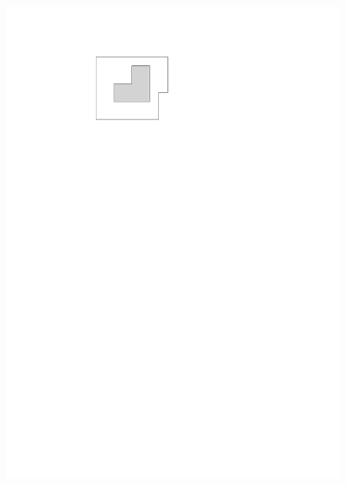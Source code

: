 \documentclass[english,gradu]{tktltiki2018}
\begin{document}
\begin{figure}\centering
	\includegraphics[scale=0.6,page=2]{fig/decomp}
	\hfil

\end{figure}
\end{document}
